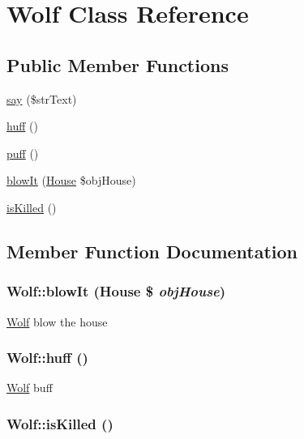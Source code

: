 \hypertarget{class_wolf}{
\section{Wolf Class Reference}
\label{class_wolf}
}
\subsection*{Public Member Functions}
\begin{CompactItemize}
\item 
\hyperlink{class_wolf_2f051de20068c32049b0b665b2482c46}{say} (\$strText)
\item 
\hyperlink{class_wolf_784269c7a0366f57bd5641d6f8c33757}{huff} ()
\item 
\hyperlink{class_wolf_8ffe137382326ecef3081257c057794b}{puff} ()
\item 
\hyperlink{class_wolf_5143821e7add67a7b9cbfcbeed68e91d}{blowIt} (\hyperlink{class_house}{House} \$objHouse)
\item 
\hyperlink{class_wolf_0bd4604441af2204eae5db24b6665b74}{isKilled} ()
\end{CompactItemize}


\subsection{Member Function Documentation}
\hypertarget{class_wolf_5143821e7add67a7b9cbfcbeed68e91d}{
\subsubsection[{blowIt}]{\setlength{\rightskip}{0pt plus 5cm}Wolf::blowIt ({\bf House} \$ {\em objHouse})}}
\label{class_wolf_5143821e7add67a7b9cbfcbeed68e91d}


\hyperlink{class_wolf}{Wolf} blow the house \hypertarget{class_wolf_784269c7a0366f57bd5641d6f8c33757}{
\subsubsection[{huff}]{\setlength{\rightskip}{0pt plus 5cm}Wolf::huff ()}}
\label{class_wolf_784269c7a0366f57bd5641d6f8c33757}


\hyperlink{class_wolf}{Wolf} buff \hypertarget{class_wolf_0bd4604441af2204eae5db24b6665b74}{
\subsubsection[{isKilled}]{\setlength{\rightskip}{0pt plus 5cm}Wolf::isKilled ()}}
\label{class_wolf_0bd4604441af2204eae5db24b6665b74}


